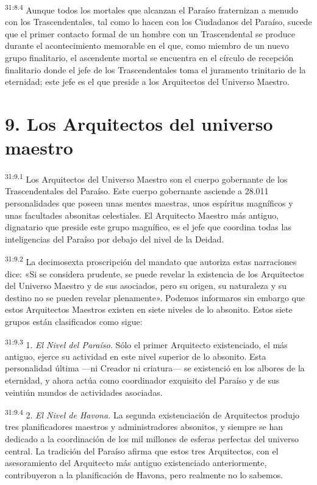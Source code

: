 \par
\textsuperscript{31:8.4} Aunque todos los mortales que alcanzan el Paraíso fraternizan a menudo con los Trascendentales, tal como lo hacen con los Ciudadanos del Paraíso, sucede que el primer contacto formal de un hombre con un Trascendental se produce durante el acontecimiento memorable en el que, como miembro de un nuevo grupo finalitario, el ascendente mortal se encuentra en el círculo de recepción finalitario donde el jefe de los Trascendentales toma el juramento trinitario de la eternidad; este jefe es el que preside a los Arquitectos del Universo Maestro.

\section*{9. Los Arquitectos del universo maestro}
\par
\textsuperscript{31:9.1} Los Arquitectos del Universo Maestro son el cuerpo gobernante de los Trascendentales del Paraíso. Este cuerpo gobernante asciende a 28.011 personalidades que poseen unas mentes maestras, unos espíritus magníficos y unas facultades absonitas celestiales. El Arquitecto Maestro más antiguo, dignatario que preside este grupo magnífico, es el jefe que coordina todas las inteligencias del Paraíso por debajo del nivel de la Deidad.

\par
\textsuperscript{31:9.2} La decimosexta proscripción del mandato que autoriza estas narraciones dice: «Si se considera prudente, se puede revelar la existencia de los Arquitectos del Universo Maestro y de sus asociados, pero su origen, su naturaleza y su destino no se pueden revelar plenamente». Podemos informaros sin embargo que estos Arquitectos Maestros existen en siete niveles de lo absonito. Estos siete grupos están clasificados como sigue:

\par
\textsuperscript{31:9.3} 1. \textit{El Nivel del Paraíso.} Sólo el primer Arquitecto existenciado, el más antiguo, ejerce su actividad en este nivel superior de lo absonito. Esta personalidad última ---ni Creador ni criatura--- se existenció en los albores de la eternidad, y ahora actúa como coordinador exquisito del Paraíso y de sus veintiún mundos de actividades asociadas.

\par
\textsuperscript{31:9.4} 2. \textit{El Nivel de Havona.} La segunda existenciación de Arquitectos produjo tres planificadores maestros y administradores absonitos, y siempre se han dedicado a la coordinación de los mil millones de esferas perfectas del universo central. La tradición del Paraíso afirma que estos tres Arquitectos, con el asesoramiento del Arquitecto más antiguo existenciado anteriormente, contribuyeron a la planificación de Havona, pero realmente no lo sabemos.

